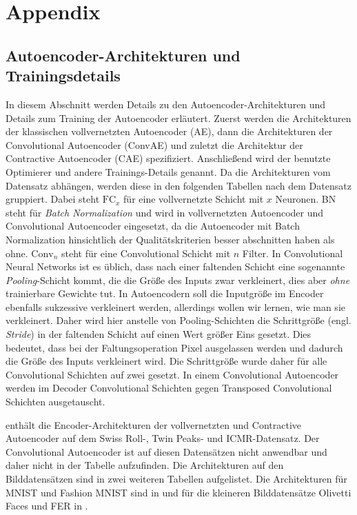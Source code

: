 
\chapter{Appendix}
\label{ch:Appendix}

\section{Autoencoder-Architekturen und Trainingsdetails}
\label{ch:Appendix:Architektur-Details}
In diesem Abschnitt werden Details zu den Autoencoder-Architekturen und Details zum Training der Autoencoder erläutert. Zuerst werden die Architekturen der klassischen vollvernetzten Autoencoder (AE), dann die Architekturen der Convolutional Autoencoder (ConvAE) und zuletzt die Architektur der Contractive Autoencoder (CAE) spezifiziert. Anschließend wird der benutzte Optimierer und andere Trainings-Details genannt. Da die Architekturen
vom Datensatz abhängen, werden diese in den folgenden Tabellen nach dem Datensatz gruppiert. Dabei steht $\text{FC}_{x}$ für eine vollvernetzte Schicht mit $x$ Neuronen. BN steht für \textit{Batch Normalization} \parencite{Ioffe.2015} und wird in vollvernetzten Autoencoder und Convolutional Autoencoder eingesetzt,
da die Autoencoder mit Batch Normalization hinsichtlich der Qualitätskriterien besser abschnitten
haben als ohne. $\text{Conv}_n$ steht für eine Convolutional Schicht mit $n$ Filter. In
Convolutional Neural Networks ist es üblich, dass nach einer faltenden Schicht eine sogenannte
\textit{Pooling}-Schicht \parencite[339 -- 345]{Goodfellow.2016} kommt, die die Größe des Inputs zwar verkleinert, dies aber
\textit{ohne} trainierbare Gewichte tut. In Autoencodern soll die Inputgröße im Encoder ebenfalls
sukzessive verkleinert werden, allerdings wollen wir lernen, wie man sie verkleinert. Daher wird
hier anstelle von Pooling-Schichten die Schrittgröße (engl. \textit{Stride}) in der faltenden
Schicht auf einen Wert größer Eins gesetzt. Dies bedeutet, dass bei der Faltungsoperation Pixel
ausgelassen werden und dadurch die Größe des Inputs verkleinert wird. Die Schrittgröße wurde daher
für alle Convolutional Schichten auf zwei gesetzt. In einem Convolutional Autoencoder werden im
Decoder Convolutional Schichten gegen Transposed Convolutional Schichten \parencite[siehe][]{Zeiler.2010} ausgetauscht.

 enthält die Encoder-Architekturen der vollvernetzten und Contractive Autoencoder auf dem Swiss Roll-, Twin Peaks- und ICMR-Datensatz.
Der Convolutional Autoencoder ist auf diesen Datensätzen nicht anwendbar und daher nicht in der Tabelle aufzufinden. Die Architekturen auf den Bilddatensätzen sind in zwei weiteren Tabellen aufgelistet. Die Architekturen für MNIST und Fashion MNIST sind in 
 und für die kleineren Bilddatensätze Olivetti Faces und FER in .


